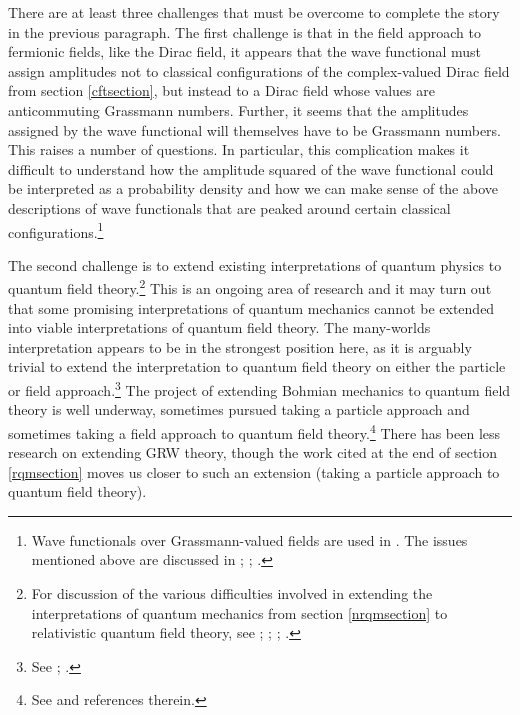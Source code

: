 \documentclass[onecolumn,secnumarabic,amsmath,amssymb,balancelastpage,nofootinbib]{article}
\begin{document}
There are at least three challenges that must be overcome to complete the story in the previous paragraph.  The first challenge is that in the field approach to fermionic fields, like the Dirac field, it appears that the wave functional must assign amplitudes not to classical configurations of the complex-valued Dirac field from section \ref{cftsection}, but instead to a Dirac field whose values are anticommuting Grassmann numbers.  Further, it seems that the amplitudes assigned by the wave functional will themselves have to be Grassmann numbers.  This raises a number of questions.  In particular, this complication makes it difficult to understand how the amplitude squared of the wave functional could be interpreted as a probability density and how we can make sense of the above descriptions of wave functionals that are peaked around certain classical configurations.\footnote{Wave functionals over Grassmann-valued fields are used in \citet{floreanini1988, jackiw1990, hatfield, valentini1992, valentini1996}.  The issues mentioned above are discussed in \citet[sec.\ 9.2]{struyve2010}; \citet[sec.\ 3.3]{struyve2011}; \citet[appendix A]{positrons}.}

The second challenge is to extend existing interpretations of quantum physics to quantum field theory.\footnote{For discussion of the various difficulties involved in extending the interpretations of quantum mechanics from section \ref{nrqmsection} to relativistic quantum field theory, see \citet{wallace2008}; \citet{barrett2014}; \citet[ch.\ 7]{maudlinQM}; \citet[ch.\ 11--12]{durr2020}.}  This is an ongoing area of research and it may turn out that some promising interpretations of quantum mechanics cannot be extended into viable interpretations of quantum field theory.  The many-worlds interpretation appears to be in the strongest position here, as it is arguably trivial to extend the interpretation to quantum field theory on either the particle or field approach.\footnote{See \citet{wallace2008, wallace2018, wallace2020}; \citet[sec.\ 1.7]{wallaceQM}.}  The project of extending Bohmian mechanics to quantum field theory is well underway, sometimes pursued taking a particle approach and sometimes taking a field approach to quantum field theory.\footnote{See \citet{struyve2010, struyve2011, tumulka2018} and references therein.}  There has been less research on extending GRW theory, though the work cited at the end of section \ref{rqmsection} moves us closer to such an extension (taking a particle approach to quantum field theory).
\end{document}
